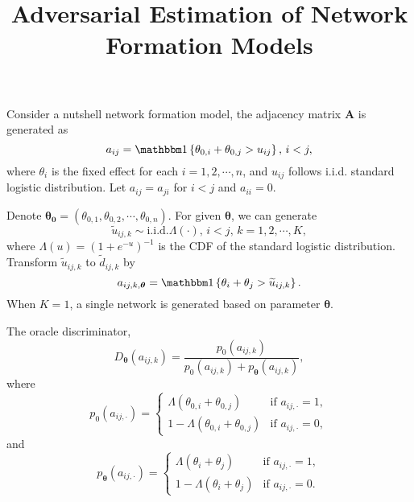 



\title{Adversarial Estimation of Network Formation Models}
\date{}


\maketitle

\newpage

Consider a nutshell network formation model, the adjacency matrix \(\bm{A}\) is generated as 
\[
    a_{ij} = \I\left\{ \theta _{0, i} + \theta _{0,j} > u_{ij} \right\}, \, i< j, 
\]
where \(\theta _{i} \) is the fixed effect for each \(i = 1,2,\cdots, n\), and \(u_{ij} \) follows i.i.d. standard logistic distribution. Let \(a_{ij} = a_{ji} \) for \(i < j\) and \(a_{ii} = 0\).

Denote \(\bm{\theta_{0} } = \left( 
        \theta _{0, 1}, \theta _{0, 2}, \cdots, \theta _{0, n}  
    \right) 
\). For given \(\bm{\theta }\), we can generate
\[
    \widetilde{u}_{ij,k} \sim \text{i.i.d.}\Lambda\left( \cdot \right),\, i < j,\, k = 1, 2, \cdots, K,
\]
where \(\Lambda\left( u \right) = \left( 1 + e^{-u} \right)^{-1} \) is the CDF of the standard logistic distribution. Transform \(\widetilde{u}_{ij, k} \) to \(\widetilde{d}_{ij, k}\) by
\[
    a_{ij, k, \bm{\theta}} = \I \left\{ \theta _{i} + \theta _{j} > \widetilde{u}_{ij, k}  \right\} .
\]  
When \(K = 1\), a single network is generated based on parameter \(\bm{\theta }\).

The oracle discriminator,
\[
    D_{\bm{\theta } } \left( a_{ij, k}  \right) =  
    \frac{
        p_{0}\left( a_{ij, k}  \right)
    }{
        p_{0}\left( a_{ij, k}  \right) + p_{\bm{\theta } } \left( a_{ij, k}  \right)  
    },
\]
where
\[
    p_{0}\left( a_{ij, \cdot}  \right) = \begin{cases}
        \Lambda \left( \theta_{0, i} + \theta _{0, j} \right) & \text{if } a_{ij, \cdot} = 1,\\
        1 - \Lambda \left( \theta_{0, i} + \theta _{0, j} \right) & \text{if } a_{ij, \cdot} = 0,
    \end{cases}
\]
and
\[
    p_{\bm{\theta }}\left( a_{ij, \cdot}  \right) = \begin{cases}
        \Lambda \left( \theta_{i} + \theta _{j} \right) & \text{if } a_{ij,\cdot} = 1,\\
        1 - \Lambda \left( \theta_{i} + \theta _{j} \right) & \text{if } a_{ij,\cdot} = 0.
    \end{cases}
\]


